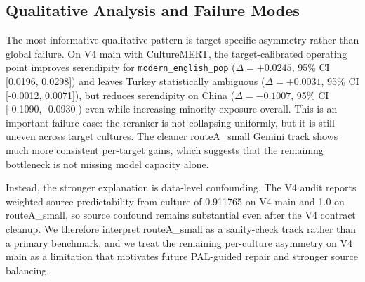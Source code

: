 \subsection{Qualitative Analysis and Failure Modes}

The most informative qualitative pattern is target-specific asymmetry rather than global failure. On V4 main with CultureMERT, the target-calibrated operating point improves serendipity for \texttt{modern\_english\_pop} ($\Delta=+0.0245$, 95\% CI [0.0196, 0.0298]) and leaves Turkey statistically ambiguous ($\Delta=+0.0031$, 95\% CI [-0.0012, 0.0071]), but reduces serendipity on China ($\Delta=-0.1007$, 95\% CI [-0.1090, -0.0930]) even while increasing minority exposure overall. This is an important failure case: the reranker is not collapsing uniformly, but it is still uneven across target cultures. The cleaner routeA_small Gemini track shows much more consistent per-target gains, which suggests that the remaining bottleneck is not missing model capacity alone.

Instead, the stronger explanation is data-level confounding. The V4 audit reports weighted source predictability from culture of 0.911765 on V4 main and 1.0 on routeA_small, so source confound remains substantial even after the V4 contract cleanup. We therefore interpret routeA_small as a sanity-check track rather than a primary benchmark, and we treat the remaining per-culture asymmetry on V4 main as a limitation that motivates future PAL-guided repair and stronger source balancing.
